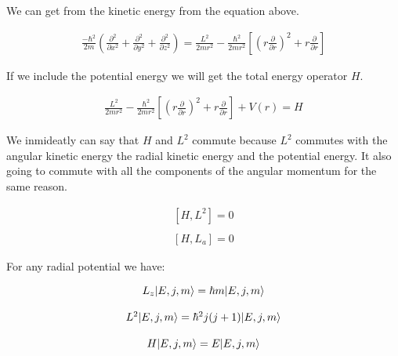 We can get from the kinetic energy from the equation above.

\begin{equation}
  \begin{array}{c}
    \frac{-\hbar^2}{2m} \left(\frac{\partial^2}{\partial x^2}+\frac{\partial^2}{\partial y^2}+\frac{\partial^2}{\partial z^2}\right) = \frac{L^2}{2mr^2}-\frac{\hbar^2}{2mr^2}\left[\left(r\frac{\partial}{\partial r}\right)^2+r\frac{\partial}{\partial r}\right]
  \end{array}
\end{equation}

If we include the potential energy we will get the total energy operator $H$.

\begin{equation}
  \begin{array}{c}
    \frac{L^2}{2mr^2}-\frac{\hbar^2}{2mr^2}\left[\left(r\frac{\partial}{\partial r}\right)^2+r\frac{\partial}{\partial r}\right] + V(r) = H
  \end{array}
\end{equation}

We inmideatly can say that $H$ and $L^2$ commute because $L^2$ commutes with the angular kinetic energy the radial kinetic energy and the potential energy. It also going to commute with all the components of the angular momentum for the same reason.

\begin{equation}
  \begin{array}{c}
    \left[H,L^2\right] = 0
    \\

    \\
    \left[H,L_a\right] = 0
  \end{array}
\end{equation}

For any radial potential we have:

\begin{equation}
  \begin{array}{c}
    L_z \lvert E,j,m\rangle = \hbar m \lvert E,j,m\rangle
    \\

    \\
    L^2 \lvert E,j,m\rangle = \hbar^2 j(j+1) \lvert E,j,m\rangle
    \\

    \\
    H \lvert E,j,m\rangle = E \lvert E,j,m\rangle
  \end{array}
\end{equation}

